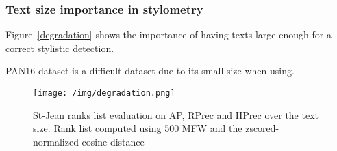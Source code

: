 \subsubsection{Text size importance in stylometry}

Figure~\ref{degradation} shows the importance of having texts large enough for a correct stylistic detection.

PAN16 dataset is a difficult dataset due to its small size when using.

\begin{figure}
  \texttt{[image: /img/degradation.png]}
  \caption{St-Jean ranks list evaluation on AP, RPrec and HPrec over the text size. Rank list computed using 500 MFW and the zscored-normalized cosine distance}
  \label{img:degradation}
\end{figure}
